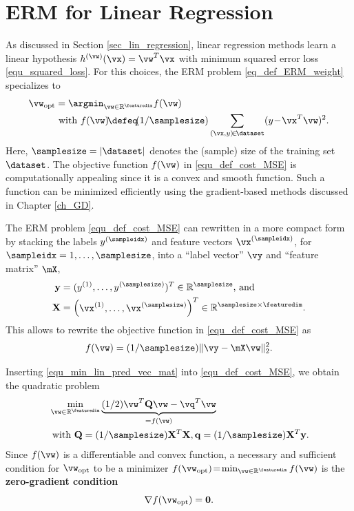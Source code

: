 \documentclass[12pt]{report}
\begin{document}
\section{ERM for Linear Regression}
\label{sec_ERM_lin_reg}

As discussed in Section \ref{sec_lin_regression}, linear regression methods 
learn a linear hypothesis $h^{(\vw)}(\vx) = \vw^{T} \vx$ with minimum squared 
error loss \eqref{equ_squared_loss}. For this choices, the ERM problem \eqref{eq_def_ERM_weight} 
specializes to  
\begin{align}
\label{equ_def_cost_MSE}
\vw_{\rm opt} & = \argmin_{\vw \in \mathbb{R}^{\featuredim}} f(\vw) \nonumber \\ 
& \mbox{ with } f(\vw)\!\defeq\!(1/\samplesize) \sum_{(\vx,y)\!\in\!\dataset} (y \!-\! \vx^{T} \vw )^2.
\end{align} 
Here, $\samplesize=|\dataset|$ denotes the (sample) size of the training set $\dataset$. 
The objective function $f(\vw)$ in \eqref{equ_def_cost_MSE} is computationally 
appealing since it is a convex and smooth function. Such a function can be minimized 
efficiently using the gradient-based methods discussed in Chapter \ref{ch_GD}. 

The ERM problem \eqref{equ_def_cost_MSE} can rewritten in a more compact form 
by stacking the labels $y^{(\sampleidx)}$ and feature vectors $\vx^{(\sampleidx)}$, for 
$\sampleidx=1,\ldots,\samplesize$, into a ``label vector'' $\vy$ and ``feature matrix'' $\mX$, 
\begin{align}
\label{equ_def_vec_matrix}
\mathbf{y} & = ( y^{(1)},\ldots, y^{(\samplesize)})^{T} \in \mathbb{R}^{\samplesize} \mbox{, and } \nonumber \\ 
\mathbf{X} & = \begin{pmatrix} \vx^{(1)},\ldots,\vx^{(\samplesize)} \end{pmatrix}^{T}\in \mathbb{R}^{\samplesize \times \featuredim}.
\end{align}
This allows to rewrite the objective function in \eqref{equ_def_cost_MSE} as 
\begin{equation}
\label{equ_min_lin_pred_vec_mat}
f(\vw) = (1/\samplesize) \| \vy - \mX\vw \|^{2}_{2}.
\end{equation} 

Inserting \eqref{equ_min_lin_pred_vec_mat} into \eqref{equ_def_cost_MSE}, 
we obtain the quadratic problem 
\begin{align}
\label{equ_quadr_form_linreg}
& \min_{\vw \in \mathbb{R}^{\featuredim}} \underbrace{(1/2) \vw^{T} \mathbf{Q} \vw - \vq^{T}  \vw}_{= f(\vw)} \nonumber \\
& \mbox{ with } \mathbf{Q}= (1/\samplesize) \mathbf{X}^{T} \mathbf{X}, \mathbf{q} =(1/\samplesize) \mathbf{X}^{T} \mathbf{y}. 
\end{align} 
Since $f(\vw)$ is a differentiable and convex function, a necessary and sufficient condition for 
$\vw_{\rm opt}$ to be a minimizer $f(\vw_{\rm opt})\!=\!\min_{\vw \in \mathbb{R}^{\featuredim}} f(\vw)$ is the 
{\bf zero-gradient condition} \cite[Sec. 4.2.3]{BoydConvexBook}
\begin{equation}
\label{equ_zero_gradient}
 \nabla f(\vw_{\rm opt}) = \mathbf{0}.
\end{equation} 
\end{document}
